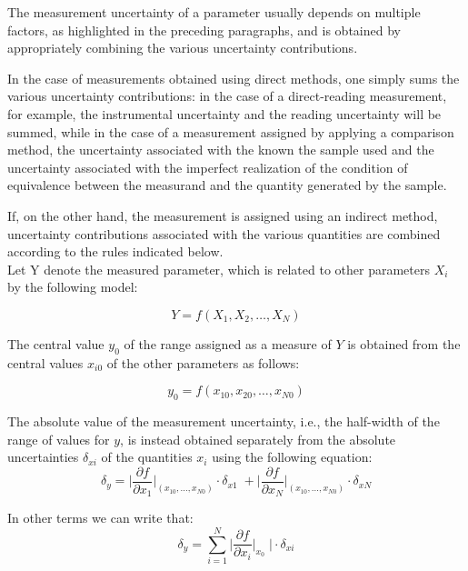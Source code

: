 \documentclass[../main.tex]{subfiles}
\begin{document}
The measurement uncertainty of a parameter usually depends on multiple factors, as highlighted in the preceding paragraphs, and is obtained by appropriately combining the various uncertainty contributions.

In the case of measurements obtained using direct methods, one simply sums the various uncertainty contributions: in the case of a direct-reading measurement, for example, the instrumental uncertainty and the reading uncertainty will be summed, while in the case of a measurement assigned by applying a comparison method, the uncertainty associated with the known the sample used and the uncertainty associated with the imperfect realization of the condition of  equivalence between the measurand and the quantity generated by the sample.

If, on the other hand, the measurement is assigned using an indirect method, uncertainty contributions associated with the various quantities are combined according to the rules indicated below.\\

Let Y denote the measured parameter, which is related to other parameters $X_i$ by the following model:

\begin{equation}
	Y = f(X_1,X_2,\dots, X_N)
\end{equation}

The central value $y_0$ of the range assigned as a measure of $Y$ is obtained from the central values $x_{i0}$ of the other parameters as follows:

\begin{equation}
	y_0 = f(x_{10}, x_{20}, \dots, x_{N0})
\end{equation}

The absolute value of the measurement uncertainty, i.e., the half-width of the range of values for $y$, is instead obtained separately from the absolute uncertainties $\delta_{xi}$ of the quantities $x_i$ using the following equation:\\


\begin{equation}
	\delta_y = \bigg|  \frac{\partial f}{\partial x_1}   \bigg|_{(x_{10},\dots,x_{N0})} \cdot \delta_{x1} \; + \bigg| \frac{\partial f}{\partial x_N}   \bigg|_{(x_{10},\dots,x_{N0})} \cdot \delta_{xN} 
\end{equation}

In other terms we can write that:\\

\begin{equation}
	\delta_y = \sum_{i = 1}^N  \Bigg| \frac{\partial f}{\partial x_i} \bigg|_{x_0} \; \Bigg| \cdot \delta_{xi}	
\end{equation}
\end{document}
